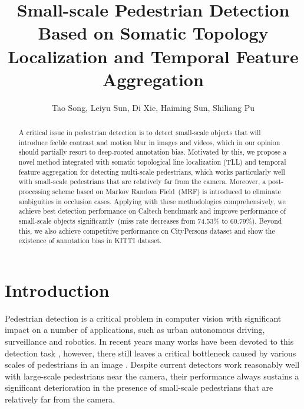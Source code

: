 \documentclass[runningheads]{llncs}
\begin{document}
\pagestyle{headings}
\mainmatter
\def\ECCV18SubNumber{}  %

\title{Small-scale Pedestrian Detection Based on Somatic Topology Localization and Temporal Feature Aggregation} %


\authorrunning{}

\author{Tao Song, Leiyu Sun, Di Xie, Haiming Sun, Shiliang Pu}


\maketitle

\begin{abstract}
A critical issue in pedestrian detection is to detect small-scale objects that will introduce feeble contrast and motion blur in images and videos, which in our opinion should partially resort to deep-rooted annotation bias. Motivated by this, we propose a novel method integrated with somatic topological line localization (TLL) and temporal feature aggregation for detecting multi-scale pedestrians, which works particularly well with small-scale pedestrians that are relatively far from the camera. Moreover, a post-processing scheme based on Markov Random Field~(MRF) is introduced to eliminate ambiguities in occlusion cases. Applying with these methodologies comprehensively, we achieve best detection performance on Caltech benchmark and improve performance of small-scale objects significantly~(miss rate decreases from 74.53\% to 60.79\%). Beyond this, we also achieve competitive performance on CityPersons dataset and show the existence of annotation bias in KITTI dataset.
{}
\end{abstract}


\section{Introduction}
Pedestrian detection is a critical problem in computer vision with significant impact on a number of applications, such as urban autonomous driving, surveillance and robotics. In recent years many works have been devoted to this detection task \cite{PDSummary,FeaPyramid,FRCNNPD}, however, there still leaves a critical bottleneck caused by various scales of pedestrians in an image \cite{SAFRCNN,MSCNN}. Despite current detectors work reasonably well with large-scale pedestrians near the camera, their performance always sustains a significant deterioration in the presence of small-scale pedestrians that are relatively far from the camera.
\end{document}
